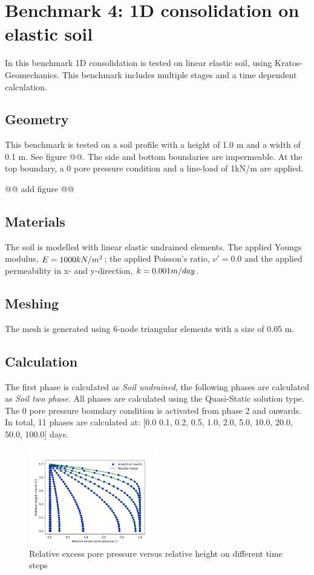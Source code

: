 \documentclass{deltares_manual_style}
\begin{document}
\chapter{Benchmark 4: 1D consolidation on elastic soil}
In this benchmark 1D consolidation is tested on linear elastic soil, using Kratos-Geomechanics. This benchmark includes multiple stages and a time dependent calculation.

\section{Geometry}

This benchmark is tested on a soil profile with a height of 1.0 m and a width of 0.1 m. See figure @@. The side and bottom boundaries are impermeable. At the top boundary, a 0 pore pressure condition and a line-load of 1kN/m are applied. 

@@ add figure @@

\section{Materials}
The soil is modelled with linear elastic undrained elements. The applied Youngs modulus, $E=1000\space kN/m^{2}$; the applied Poisson's ratio, $\nu'=0.0$ and the applied permeability in x- and y-direction, $k=0.001 \space m/day$.

\section{Meshing}
The mesh is generated using 6-node triangular elements with a size of 0.05 m.  




\section{Calculation}

The first phase is calculated as \textit{Soil undrained}, the following phases are calculated as \textit{Soil two phase}. All phases are calculated using the Quasi-Static solution type. The 0 pore pressure boundary condition is activated from phase 2 and onwards. In total, 11 phases are calculated at: [0.0 0.1, 0.2, 0.5, 1.0, 2.0, 5.0, 10.0, 20.0, 50.0, 100.0] days.



\begin{figure}[h]
	\centering
	\includegraphics[width=0.50\textwidth]{figures/1d_consolidation_result.png}
	\caption{Relative excess pore pressure versus relative height on different time steps}
	\label{fig:1d_consolidation_bm_4}
\end{figure}
\end{document}

